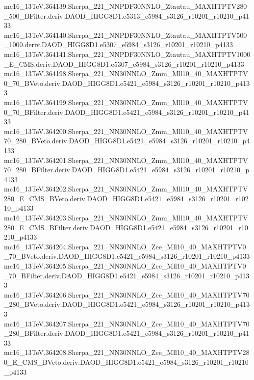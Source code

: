 \begin{footnotesize}
mc16\_13TeV.364139.Sherpa\_221\_NNPDF30NNLO\_Ztautau\_MAXHTPTV280\_500\_BFilter.deriv.DAOD\_HIGG8D1.e5313\_e5984\_s3126\_r10201\_r10210\_p4133 \\
mc16\_13TeV.364140.Sherpa\_221\_NNPDF30NNLO\_Ztautau\_MAXHTPTV500\_1000.deriv.DAOD\_HIGG8D1.e5307\_e5984\_s3126\_r10201\_r10210\_p4133 \\
mc16\_13TeV.364141.Sherpa\_221\_NNPDF30NNLO\_Ztautau\_MAXHTPTV1000\_E\_CMS.deriv.DAOD\_HIGG8D1.e5307\_e5984\_s3126\_r10201\_r10210\_p4133 \\
mc16\_13TeV.364198.Sherpa\_221\_NN30NNLO\_Zmm\_Mll10\_40\_MAXHTPTV0\_70\_BVeto.deriv.DAOD\_HIGG8D1.e5421\_e5984\_s3126\_r10201\_r10210\_p4133 \\
mc16\_13TeV.364199.Sherpa\_221\_NN30NNLO\_Zmm\_Mll10\_40\_MAXHTPTV0\_70\_BFilter.deriv.DAOD\_HIGG8D1.e5421\_e5984\_s3126\_r10201\_r10210\_p4133 \\
mc16\_13TeV.364200.Sherpa\_221\_NN30NNLO\_Zmm\_Mll10\_40\_MAXHTPTV70\_280\_BVeto.deriv.DAOD\_HIGG8D1.e5421\_e5984\_s3126\_r10201\_r10210\_p4133 \\
mc16\_13TeV.364201.Sherpa\_221\_NN30NNLO\_Zmm\_Mll10\_40\_MAXHTPTV70\_280\_BFilter.deriv.DAOD\_HIGG8D1.e5421\_e5984\_s3126\_r10201\_r10210\_p4133 \\
mc16\_13TeV.364202.Sherpa\_221\_NN30NNLO\_Zmm\_Mll10\_40\_MAXHTPTV280\_E\_CMS\_BVeto.deriv.DAOD\_HIGG8D1.e5421\_e5984\_s3126\_r10201\_r10210\_p4133 \\
mc16\_13TeV.364203.Sherpa\_221\_NN30NNLO\_Zmm\_Mll10\_40\_MAXHTPTV280\_E\_CMS\_BFilter.deriv.DAOD\_HIGG8D1.e5421\_e5984\_s3126\_r10201\_r10210\_p4133 \\
mc16\_13TeV.364204.Sherpa\_221\_NN30NNLO\_Zee\_Mll10\_40\_MAXHTPTV0\_70\_BVeto.deriv.DAOD\_HIGG8D1.e5421\_e5984\_s3126\_r10201\_r10210\_p4133 \\
mc16\_13TeV.364205.Sherpa\_221\_NN30NNLO\_Zee\_Mll10\_40\_MAXHTPTV0\_70\_BFilter.deriv.DAOD\_HIGG8D1.e5421\_e5984\_s3126\_r10201\_r10210\_p4133 \\
mc16\_13TeV.364206.Sherpa\_221\_NN30NNLO\_Zee\_Mll10\_40\_MAXHTPTV70\_280\_BVeto.deriv.DAOD\_HIGG8D1.e5421\_e5984\_s3126\_r10201\_r10210\_p4133 \\
mc16\_13TeV.364207.Sherpa\_221\_NN30NNLO\_Zee\_Mll10\_40\_MAXHTPTV70\_280\_BFilter.deriv.DAOD\_HIGG8D1.e5421\_e5984\_s3126\_r10201\_r10210\_p4133 \\
mc16\_13TeV.364208.Sherpa\_221\_NN30NNLO\_Zee\_Mll10\_40\_MAXHTPTV280\_E\_CMS\_BVeto.deriv.DAOD\_HIGG8D1.e5421\_e5984\_s3126\_r10201\_r10210\_p4133 \\

\end{footnotesize}
